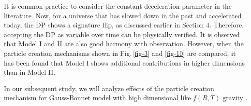 \documentclass[superscriptaddress,showpacs,pre,twocolumn]{revtex4-1}
\begin{document}
It is common practice to consider the constant deceleration parameter in the literature. Now, for a universe that has slowed down in the past and accelerated today, the DP shows a signature flip,  as discussed earlier in Section 4. Therefore, accepting the DP as variable over time can be physically verified. It is observed that Model I and II are also good harmony with observation. However, when the particle creation mechanisms shown in Fig.\,\ref{fig-3} and \ref{fig-10} are compared, it has been found that Model I shows additional contributions in higher dimensions than in Model II. 

In our subsequent study, we will analyze effects of the particle creation mechanism for Gauss-Bonnet model with high dimensional like $f(R,T)$ gravity \cite{Singh2016}. 




 
\end{document}
